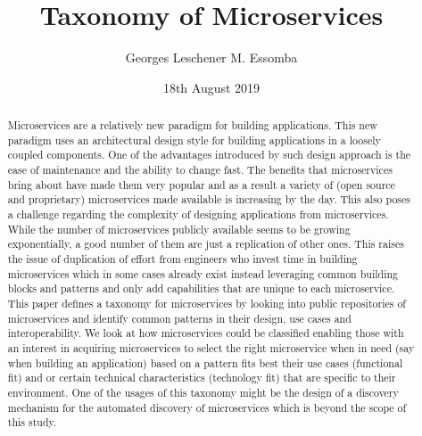 \documentclass{article}
\begin{document}
\author{Georges Leschener M. Essomba}
\title{Taxonomy of Microservices}
\date{18th August 2019} %

\maketitle{} %

\pagebreak %
\tableofcontents %
\pagebreak %

\renewcommand*\abstractname{\flushleft\textbf{Abstract}\hfill}
\begin{abstract}

\noindent Microservices are a relatively new paradigm for building applications. This new paradigm uses an architectural design style for building applications in a loosely coupled components. One of the advantages introduced by such design approach is the ease of maintenance and the ability to change fast. The benefits that microservices bring about have made them very popular and as a result a variety of (open source and proprietary) microservices made available is increasing by the day. This also poses a challenge regarding the complexity of designing applications from microservices. While the number of microservices publicly available seems to be growing exponentially, a good number of them are just a replication of other ones. This raises the issue of duplication of effort from engineers who invest time in building microservices which in some cases already exist instead leveraging common building blocks and patterns and only add capabilities that are unique to each microservice. This paper defines a taxonomy for microservices by looking into public repositories of microservices and identify common patterns in their design, use cases and interoperability. We look at how microservices could be classified enabling those with an interest in acquiring microservices to select the right microservice when in need (say when building an application) based on a pattern fits best their use cases (functional fit) and or certain technical characteristics (technology fit) that are specific to their environment. One of the usages of this taxonomy might be the design of a discovery mechanism for the automated discovery of microservices which is beyond the scope of this study.


\end{abstract}
\end{document}
